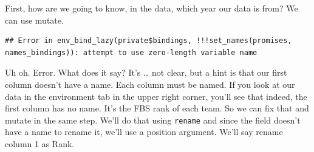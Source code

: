 \documentclass[
]{book}
\newenvironment{Shaded}{\begin{snugshade}}{\end{snugshade}}
\newcommand{\DataTypeTok}[1]{\textcolor[rgb]{0.13,0.29,0.53}{#1}}
\newcommand{\DecValTok}[1]{\textcolor[rgb]{0.00,0.00,0.81}{#1}}
\newcommand{\KeywordTok}[1]{\textcolor[rgb]{0.13,0.29,0.53}{\textbf{#1}}}
\newcommand{\NormalTok}[1]{#1}
\newcommand{\OperatorTok}[1]{\textcolor[rgb]{0.81,0.36,0.00}{\textbf{#1}}}
\newcommand{\StringTok}[1]{\textcolor[rgb]{0.31,0.60,0.02}{#1}}
\begin{document}
\begin{Shaded}
\end{Shaded}

First, how are we going to know, in the data, which year our data is from? We can use mutate.

\begin{Shaded}
\end{Shaded}

\begin{verbatim}
## Error in env_bind_lazy(private$bindings, !!!set_names(promises, names_bindings)): attempt to use zero-length variable name
\end{verbatim}

Uh oh. Error. What does it say? It's \ldots{} not clear, but a hint is that our first column doesn't have a name. Each column must be named. If you look at our data in the environment tab in the upper right corner, you'll see that indeed, the first column has no name. It's the FBS rank of each team. So we can fix that and mutate in the same step. We'll do that using \texttt{rename} and since the field doesn't have a name to rename it, we'll use a position argument. We'll say rename column 1 as Rank.

\begin{Shaded}
\end{Shaded}
\end{document}
